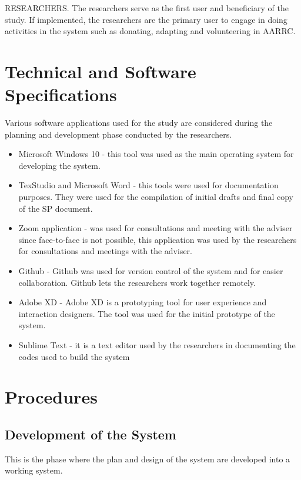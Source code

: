 RESEARCHERS. The researchers serve as the first user and beneficiary of the study. If implemented, the researchers are the primary user to engage in doing activities in the system such as donating, adapting and volunteering in AARRC.


\section{Technical and Software Specifications}

Various software applications used for the study are considered during
the planning and development phase conducted by the researchers.

\begin{itemize}
	\item Microsoft Windows 10 - this tool was used as the main
	operating system for developing the system.
	\item TexStudio and Microsoft Word - this tools were used for
	documentation purposes. They were used for the compilation of initial drafts and final copy of
	the SP document.
	\item Zoom application - was used for consultations and meeting with the adviser since
	face-to-face is not possible, this application was used by the researchers for
	consultations and meetings with the adviser.
	\item Github - Github was used for version control of the system and for easier
	collaboration. Github lets the researchers work together remotely.
	\item Adobe XD - Adobe XD is a prototyping tool for user experience and
	interaction designers. The tool was used for the initial prototype of the
	system.
	\item Sublime Text - it is a text editor used by the researchers in documenting the codes used to build the system
\end{itemize}

\section{Procedures}

\subsection{Development of the System}

This is the phase where the plan and design of the system are developed into a working system. 

